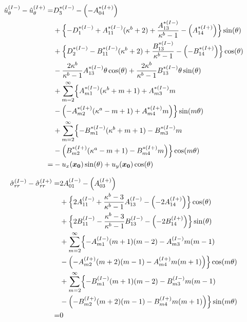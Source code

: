 \begin{align}
	\hat{u}_{\theta}^{(I-)}-\hat{u}_{\theta}^{(I+)} =&D_{3}^{*(I-)}-\Bigl(-A_{04}^{*(I+)}\Bigr)
	\nonumber
	\\
	&+\Bigl\{-D_{1}^{*(I-)}+A_{11}^{*(I-)}(\kappa^{b}+2)+\frac{A_{13}^{*(I-)}}{\kappa^{b}-1}
	-\Bigl(A_{14}^{*(I+)}\Bigr)\Bigr\}\sin(\theta)
	\nonumber
	\\
	&+\Bigl\{D_{2}^{*(I-)}-B_{11}^{*(I-)}(\kappa^{b}+2)+\frac{B_{13}^{*(I-)}}{\kappa^{b}-1}
	-\Bigl(-B_{14}^{*(I+)}\Bigr)\Bigr\}\cos(\theta)
	\nonumber
	\\
	&-\frac{2\kappa^{b}}{\kappa^{b}-1}A_{13}^{*(I-)}\theta\cos(\theta)
	+\frac{2\kappa^{b}}{\kappa^{b}-1}B_{13}^{*(I-)}\theta\sin(\theta)
	\nonumber
	\\
	&+\sum_{m=2}^{\infty}\Bigl\{A_{m1}^{*(I-)}(\kappa^{b}+m+1)
	+A_{m3}^{*(I-)}m
	\nonumber
	\\
	&-\Bigl(-A_{m2}^{*(I+)}(\kappa^{a}-m+1)
	+A_{m4}^{*(I+)}m\Bigr)\Bigr\}\sin(m\theta)
	\nonumber
	\\
	&+\sum_{m=2}^{\infty}\Bigl\{-B_{m1}^{*(I-)}(\kappa^{b}+m+1)
	-B_{m3}^{*(I-)}m
	\nonumber
	\\
	&-\Bigl(B_{m2}^{*(I+)}(\kappa^{a}-m+1)
	-B_{m4}^{*(I+)}m\Bigr)\Bigr\}\cos(m\theta)
	\nonumber
	\\
	=&-u_{x}(\bm{x_{0}})\sin(\theta)+u_{y}(\bm{x_{0}})\cos(\theta)
	\label{eq:UTh1eq}
\end{align}

\begin{align}
	\hat{\sigma}_{rr}^{(I-)}-\hat{\sigma}_{rr}^{(I+)} =
	&2A_{01}^{(I-)}-\Bigl(A_{03}^{(I+)}\Bigr)
	\nonumber
	\\
	&+\Bigl\{2A_{11}^{(I-)}+\frac{\kappa^{b}-3}{\kappa^{b}-1}A_{13}^{(I-)}
	-\Bigl(-2A_{14}^{(I+)}\Bigr)\Bigr\}\cos(\theta)
	\nonumber
	\\
	&+\Bigl\{2B_{11}^{(I-)}
	-\frac{\kappa^{b}-3}{\kappa^{b}-1}B_{13}^{(I-)}
	-\Bigl(-2B_{14}^{(I+)}\Bigr)\Bigr\}\sin(\theta)
	\nonumber
	\\
	&+\sum_{m=2}^{\infty}\Bigl\{
	-A_{m1}^{(I-)}(m+1)(m-2)-A_{m3}^{(I-)}m(m-1)
	\nonumber
	\\
	&-\Bigl(-A_{m2}^{(I+)}(m+2)(m-1)-A_{m4}^{(I+)}m(m+1)\Bigr)
	\Bigr\}\cos(m\theta)
	\nonumber
	\\
	&+\sum_{m=2}^{\infty}\Bigl\{
	-B_{m1}^{(I-)}(m+1)(m-2)-B_{m3}^{(I-)}m(m-1)
	\nonumber
	\\
	&-\Bigl(-B_{m2}^{(I+)}(m+2)(m-1)-B_{m4}^{(I+)}m(m+1)\Bigr)
	\Bigr\}\sin(m\theta)
	\nonumber
	\\
	=&0
	\label{eq:SigmaRReq}
\end{align}

